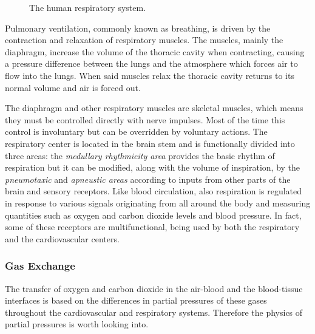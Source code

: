 \begin{figure}[b]
\caption{The human respiratory system.\ \cite{commons.wikimedia.org}}
\label{fig:respiratory_system}
\end{figure}


Pulmonary ventilation, commonly known as breathing, is driven by the contraction and relaxation of respiratory muscles. The muscles, mainly the diaphragm, increase the volume of the thoracic cavity when contracting, causing a pressure difference between the lungs and the atmosphere which forces air to flow into the lungs. When said muscles relax the thoracic cavity returns to its normal volume and air is forced out.

The diaphragm and other respiratory muscles are skeletal muscles, which means they must be controlled directly with nerve impulses. Most of the time this control is involuntary but can be overridden by voluntary actions. The respiratory center is located in the brain stem and is functionally divided into three areas: the \textit{medullary rhythmicity area} provides the basic rhythm of respiration but it can be modified, along with the volume of inspiration, by the \textit{pneumotaxic} and \textit{apneustic areas} according to inputs from other parts of the brain and sensory receptors. Like blood circulation, also respiration is regulated in response to various signals originating from all around the body and measuring quantities such as oxygen and carbon dioxide levels and blood pressure. In fact, some of these receptors are multifunctional, being used by both the respiratory and the cardiovascular centers.\ \cite{Tortora2000}

\subsubsection{Gas Exchange}

The transfer of oxygen and carbon dioxide in the air-blood and the blood-tissue interfaces is based on the differences in partial pressures of these gases throughout the cardiovascular and respiratory systems. Therefore the physics of partial pressures is worth looking into.

